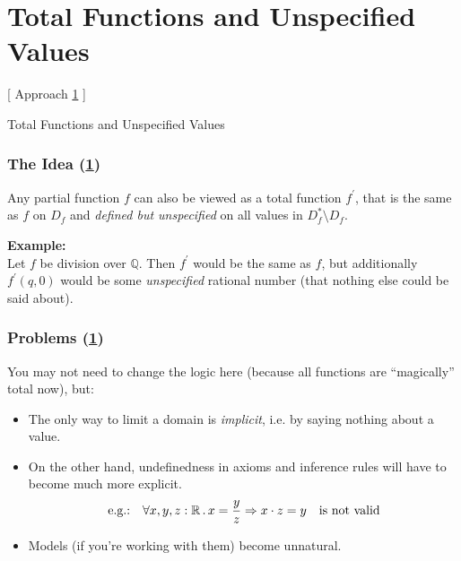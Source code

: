 \documentclass[aspectratio=169, usenames, dvipsnames]{beamer}
\begin{document}
\section{Total Functions and Unspecified Values} \label{unspecified}

\begin{frame}
\begin{center}
\Large [ Approach \ref{unspecified} ]\bigskip

Total Functions and Unspecified Values
\normalsize
\end{center}
\end{frame}

\begin{frame}
\frametitle{The Idea (\ref{unspecified})}

Any partial function $f$ can also be viewed as a total function $f^\prime$, that is the same as $f$ on $D_f$ and \emph{defined but unspecified} on all values in $D^*_f \setminus D_f$.
\bigskip

\textbf{Example:}\\Let $f$ be division over $\mathbb{Q}$. Then $f^\prime$ would be the same as $f$, but additionally $f^\prime(q,0)$ would be some \emph{unspecified} rational number (that nothing else could be said about).
\end{frame}

\begin{frame}
\frametitle{Problems (\ref{unspecified})}
You may not need to change the logic here (because all functions are ``magically'' total now), but:
\bigskip

\begin{itemize}
\item The only way to limit a domain is \emph{implicit}, i.e. by saying nothing about a value.\medskip

\item On the other hand, undefinedness in axioms and inference rules will have to become much more explicit.
$$\text{e.g.:\quad} \forall x,y,z : \mathbb{R} \,.\, x = \frac{y}{z} \Rightarrow x \cdot z = y \text{\quad is not valid}$$

\item Models (if you're working with them) become unnatural.
\end{itemize}
\end{frame}

\end{document}
